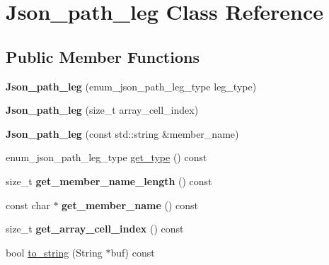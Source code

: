 \hypertarget{classJson__path__leg}{}\section{Json\+\_\+path\+\_\+leg Class Reference}
\label{classJson__path__leg}
\subsection*{Public Member Functions}
\begin{DoxyCompactItemize}
\item 
\mbox{\label{classJson__path__leg_a20fb967209d6554dde2eb11a69d4ac45}} 
{\bfseries Json\+\_\+path\+\_\+leg} (enum\+\_\+json\+\_\+path\+\_\+leg\+\_\+type leg\+\_\+type)
\item 
\mbox{\label{classJson__path__leg_ac7c0d9e027c4992bcf0b330c9606bd9b}} 
{\bfseries Json\+\_\+path\+\_\+leg} (size\+\_\+t array\+\_\+cell\+\_\+index)
\item 
\mbox{\label{classJson__path__leg_aad52950dcc0b8e42502490844e808a2b}} 
{\bfseries Json\+\_\+path\+\_\+leg} (const std\+::string \&member\+\_\+name)
\item 
enum\+\_\+json\+\_\+path\+\_\+leg\+\_\+type \mbox{\hyperlink{classJson__path__leg_ac4bdd7d72774340b7033a907cab8559c}{get\+\_\+type}} () const
\item 
\mbox{\label{classJson__path__leg_a8ec2cf8c12b89a371af1bfd45e715d7d}} 
size\+\_\+t {\bfseries get\+\_\+member\+\_\+name\+\_\+length} () const
\item 
\mbox{\label{classJson__path__leg_a8d86557eb26e6f1ec98e59deaaf29df4}} 
const char $\ast$ {\bfseries get\+\_\+member\+\_\+name} () const
\item 
\mbox{\label{classJson__path__leg_ac57a0ee4b910572022e73b18bc85c451}} 
size\+\_\+t {\bfseries get\+\_\+array\+\_\+cell\+\_\+index} () const
\item 
bool \mbox{\hyperlink{classJson__path__leg_ad9bf500a1518502e2f536782ce543ef4}{to\+\_\+string}} (String $\ast$buf) const
\end{DoxyCompactItemize}


